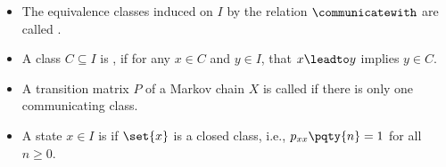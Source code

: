 \begin{definition}
    \begin{itemize}
        \item The equivalence classes induced on \(I\) by the relation \(\communicatewith\) are called .

        \item A class \(C \subseteq I\) is , if for any \(x \in C\) and \(y \in I\), that \(x \leadto y\) implies \(y \in C\).

        \item A transition matrix \(P\) of a Markov chain \(X\) is called  if there is only one communicating class.
        
        \item A state \(x \in I\) is  if \(\set{x}\) is a closed class, i.e., \(p_{xx} \pqty{n} = 1\) for all \(n \geq 0\).
    \end{itemize}
\end{definition}